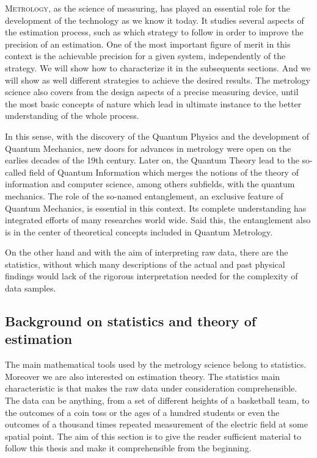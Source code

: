 \vspace{0pt}
\lettrine[lines=2, findent=3pt,nindent=0pt]{M}{etrology}, as the science of measuring, has played an essential role for the development of the technology as we know it today.
It studies several aspects of the estimation process, such as which strategy to follow in order to improve the precision of an estimation.
One of the most important figure of merit in this context is the achievable precision for a given system, independently of the strategy.
We will show how to characterize it in the subsequents sections.
And we will show as well different strategies to achieve the desired results.
The metrology science also covers from the design aspects of a precise measuring device, until the most basic concepts of nature which lead in ultimate instance to the better understanding of the whole process.

In this sense, with the discovery of the Quantum Physics and the development of Quantum Mechanics, new doors for advances in metrology were open on the earlies decades of the 19th century.
Later on, the Quantum Theory lead to the so-called field of Quantum Information which merges the notions of the theory of information and computer science, among others subfields, with the quantum mechanics.
The role of the so-named entanglement, an exclusive feature of Quantum Mechanics, is essential in this context.
Its complete understanding has integrated efforts of many researches world wide.
Said this, the entanglement also is in the center of theoretical concepts included in Quantum Metrology.

On the other hand and with the aim of interpreting raw data, there are the statistics, without which many descriptions of the actual and past physical findings would lack of the rigorous interpretation needed for the complexity of data samples.



\subsection{Background on statistics and theory of estimation}
The main mathematical tools used by the metrology science belong to statistics.
Moreover we are also interested on estimation theory.
The statistics main characteristic is that makes the raw data under consideration comprehensible.
The data can be anything, from a set of different heights of a basketball team, to the outcomes of a coin toss or the ages of a hundred students or even the outcomes of a thousand times repeated measurement of the electric field at some spatial point.
The aim of this section is to give the reader sufficient material to follow this thesis and make it comprehensible from the beginning.

